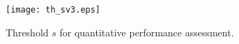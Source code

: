 \begin{figure}[ht]
\centering
\texttt{[image: th\_sv3.eps]}
\caption{Threshold $s$ for quantitative performance assessment.}
\label{fig:th_s}
\end{figure}





